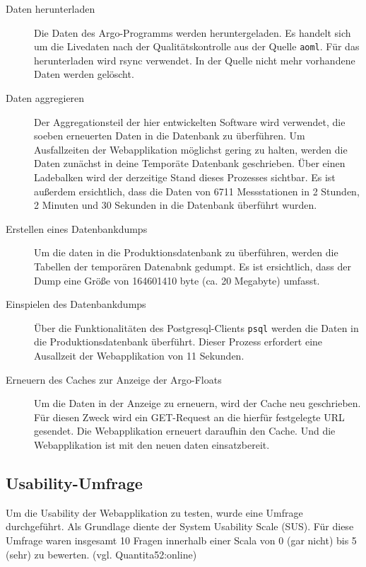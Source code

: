 \begin{description}
 \item [Daten herunterladen] 
    Die Daten des Argo-Programms werden heruntergeladen. Es handelt sich um die Livedaten nach der Qualitätskontrolle aus der Quelle \texttt{aoml}. Für das herunterladen wird rsync verwendet. In der Quelle nicht mehr vorhandene Daten werden gelöscht.
    
    
 \item [Daten aggregieren]
    Der Aggregationsteil der hier entwickelten Software wird verwendet, die soeben erneuerten Daten in die Datenbank zu überführen. Um Ausfallzeiten der Webapplikation möglichst gering zu halten, werden die Daten zunächst in deine Temporäte Datenbank geschrieben. Über einen Ladebalken wird der derzeitige Stand dieses Prozesses sichtbar. Es ist außerdem ersichtlich, dass die Daten von 6711 Messstationen in 2 Stunden, 2 Minuten und 30 Sekunden in die Datenbank überführt wurden.
    
 \item [Erstellen eines Datenbankdumps]
    Um die daten in die Produktionsdatenbank zu überführen, werden die Tabellen der temporären Datenabnk gedumpt. Es ist ersichtlich, dass der Dump eine Größe von  164601410 byte (ca. 20 Megabyte) umfasst.
    
 \item [Einspielen des Datenbankdumps]
    Über die Funktionalitäten des Postgresql-Clients \texttt{psql} werden die Daten in die Produktionsdatenbank überführt. Dieser Prozess erfordert eine Ausallzeit der Webapplikation von 11 Sekunden. 
    
 \item [Erneuern des Caches zur Anzeige der Argo-Floats]
    Um die Daten in der Anzeige zu erneuern, wird der Cache neu geschrieben. Für diesen Zweck wird ein GET-Request an die hierfür festgelegte URL gesendet. Die Webapplikation erneuert daraufhin den Cache. Und die Webapplikation ist mit den neuen daten einsatzbereit.
\end{description}



\newpage
\subsection{Usability-Umfrage}

Um die Usability der Webapplikation zu testen, wurde eine Umfrage durchgeführt. Als Grundlage diente der System Usability Scale (SUS). 
Für diese Umfrage waren insgesamt 10 Fragen innerhalb einer Scala von 0 (gar nicht) bis 5 (sehr)  zu bewerten. (vgl. Quantita52:online)

